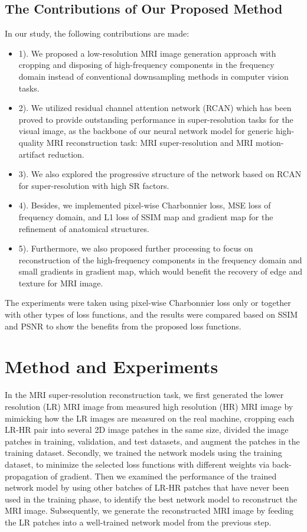 \documentclass[runningheads]{llncs}
\begin{document}
\subsection{The Contributions of Our Proposed Method}
In our study, the following contributions are made:
\begin{itemize}
    \item 1). We proposed a low-resolution MRI image generation approach with cropping and disposing of high-frequency components in the frequency domain instead of conventional downsampling methods in computer vision tasks.
    \item 2). We utilized residual channel attention network (RCAN)\cite{ref_rcan} which has been proved to provide outstanding performance in super-resolution tasks for the visual image, as the backbone of our neural network model for generic high-quality MRI reconstruction task: MRI super-resolution and MRI motion-artifact reduction. 
    \item 3). We also explored the progressive structure of the network based on RCAN for super-resolution with high SR factors.
    \item 4). Besides, we implemented pixel-wise Charbonnier loss, MSE loss of frequency domain, and L1 loss of SSIM map and gradient map for the refinement of anatomical structures.
    \item 5). Furthermore, we also proposed further processing to focus on reconstruction of the high-frequency components in the frequency domain and small gradients in gradient map, which would benefit the recovery of edge and texture for MRI image.
\end{itemize}

The experiments were taken using pixel-wise Charbonnier loss only or together with other types of loss functions, and the results were compared based on SSIM and PSNR to show the benefits from the proposed loss functions. 



\section{Method and Experiments}
In the MRI super-resolution reconstruction task, we first generated the lower resolution (LR) MRI image from measured high resolution (HR) MRI image by mimicking how the LR images are measured on the real machine, cropping each LR-HR pair into several 2D image patches in the same size, divided the image patches in training, validation, and test datasets, and augment the patches in the training dataset. Secondly, we trained the network models using the training dataset, to minimize the selected loss functions with different weights via back-propagation of gradient. Then we examined the performance of the trained network model by using other batches of LR-HR patches that have never been used in the training phase, to identify the best network model to reconstruct the MRI image. Subsequently, we generate the reconstructed MRI image by feeding the LR patches into a well-trained network model from the previous step. 
\end{document}
